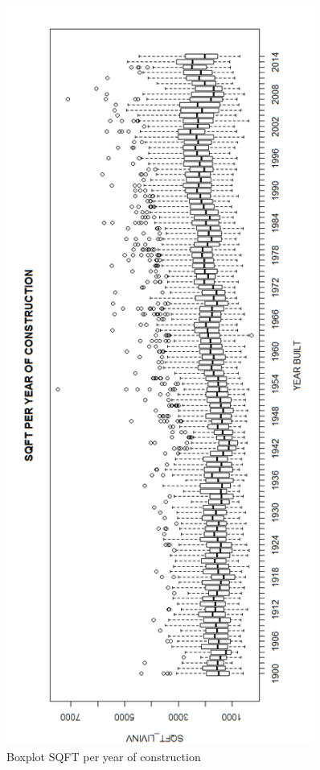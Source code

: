 \begin{figure}[!htb]
        \begin{minipage}{1\textwidth}
                \centering
                \includegraphics[width=0.90\textwidth]{pics/tutor5.png}\par\vspace{0cm}
                \caption{Boxplot SQFT per year of construction}
                \label{fig:tutor5}
        \end{minipage}
\end{figure}

